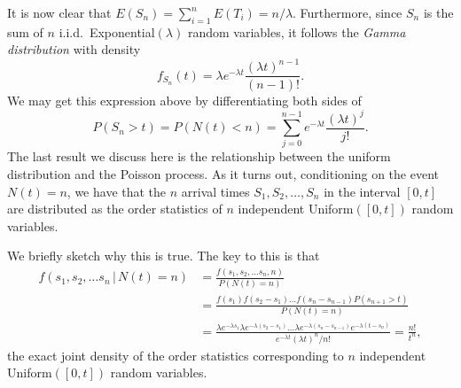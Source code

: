\documentclass[11pt]{article}
\newcommand{\where}{\,|\,}
\begin{document}
It is now clear that $E(S_{n})=\sum_{i=1}^{n}E(T_{i})=n/\lambda $. Furthermore, since $S_{n}$ is the sum of $n$ i.i.d.\ Exponential$(\lambda)$ random variables, it follows the \textit{Gamma distribution} with density
\[
f_{S_{n}}(t)=\lambda e^{- \lambda t}\frac{(\lambda t)^{n- 1}}{(n-1)!}.
\]
We may get this expression above by differentiating both sides of
\[
P(S_{n}>t)=P(N(t)<n)=\sum_{j=0}^{n- 1}e^{- \lambda t}\frac{(\lambda t)^{j}}{j!}.
\]
The last result we discuss here is the relationship between the uniform distribution and the Poisson process. As it turns out, conditioning on the event $N(t)=n$, we have that the $n$ arrival times $S_{1},S_{2},\dots ,S_{n}$ in the interval $[0,t]$ are distributed as the order statistics of $n$ independent Uniform$([0,t])$ random variables.

We briefly sketch why this is true. The key to this is that
\begin{align*}
f(s_{1},s_{2},\dots s_{n} \where N (t)=n) & =\frac{f(s_{1},s_{2},\dots s_{n},n)}{P(N(t)=n)} \\ & = \frac{f(s_{1})f(s_{2}- s_{1})\dots f(s_{n}- s_{n-1})P(s_{n+1}>t)}{P(N(t)=n)} \\
& =\frac{\lambda e^{- \lambda s_{1}}\lambda e^{- \lambda (s_{2}- s_{1})}\dots \lambda e^{- \lambda (s_{n}- s_{n- 1})}e^{- \lambda (t- s_{n})}}{e^{- \lambda t}(\lambda t)^{n}/n!}
=\frac{n!}{t^{n}},
\end{align*}
the exact joint density of the order statistics corresponding to $n$ independent 
Uniform$([0,t])$ random variables.
\end{document}
